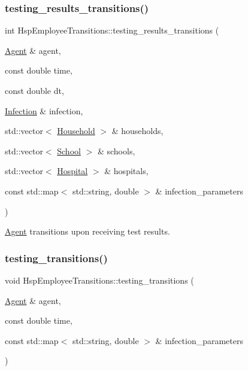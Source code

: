 \subsubsection{\texorpdfstring{testing\+\_\+results\+\_\+transitions()}{testing\_results\_transitions()}}
{\footnotesize\ttfamily int Hsp\+Employee\+Transitions\+::testing\+\_\+results\+\_\+transitions (\begin{DoxyParamCaption}\item[{\hyperlink{classAgent}{Agent} \&}]{agent,  }\item[{const double}]{time,  }\item[{const double}]{dt,  }\item[{\hyperlink{classInfection}{Infection} \&}]{infection,  }\item[{std\+::vector$<$ \hyperlink{classHousehold}{Household} $>$ \&}]{households,  }\item[{std\+::vector$<$ \hyperlink{classSchool}{School} $>$ \&}]{schools,  }\item[{std\+::vector$<$ \hyperlink{classHospital}{Hospital} $>$ \&}]{hospitals,  }\item[{const std\+::map$<$ std\+::string, double $>$ \&}]{infection\+\_\+parameters }\end{DoxyParamCaption})}



\hyperlink{classAgent}{Agent} transitions upon receiving test results. 

\mbox{\label{classHspEmployeeTransitions_ad306607b72bc170b8ac557d0483ecd14}} 
\subsubsection{\texorpdfstring{testing\+\_\+transitions()}{testing\_transitions()}}
{\footnotesize\ttfamily void Hsp\+Employee\+Transitions\+::testing\+\_\+transitions (\begin{DoxyParamCaption}\item[{\hyperlink{classAgent}{Agent} \&}]{agent,  }\item[{const double}]{time,  }\item[{const std\+::map$<$ std\+::string, double $>$ \&}]{infection\+\_\+parameters }\end{DoxyParamCaption})}



